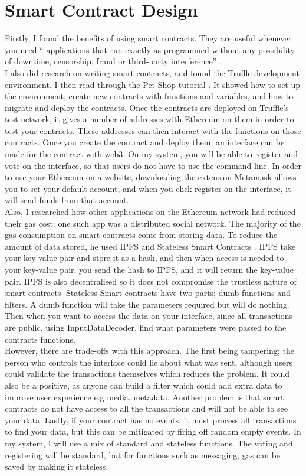 \section{Smart Contract Design} 
Firstly, I found the benefits of using smart contracts. They are useful whenever you need “ applications that run exactly as programmed without any possibility of downtime, censorship, fraud or third-party interference”  \citep{ethereum:2018:pdflatex}. \\
I also did research on writing smart contracts, and found the Truffle development environment. I then read through the Pet Shop tutorial \citep{Truffle:2017:pdflatex} . It showed how to set up the environment, create new contracts with functions and variables, and how to migrate and deploy the contracts. Once the contracts are deployed on Truffle's test network, it gives a number of addresses with Ethereum on them in order to test your contracts. These addresses can then interact with the functions on those contracts. Once you create the contract and deploy them, an interface can be made for the contract with web3. On my system, you will be able to register and vote on the interface, so that users do not have to use the command line. In order to use your Ethereum on a website, downloading the extension Metamask allows you to set your default account, and when you click register on the interface, it will send funds from that account. \\
Also, I researched how other applications on the Ethereum network had reduced their gas cost: one such app was a distributed social network. The majority of the gas consumption on smart contracts come from storing data. To reduce the amount of data stored, he used IPFS and Stateless Smart Contracts \citep{Childs-Maidment:2016:pdflatex}. IPFS take your key-value pair and store it as a hash, and then when access is needed to your key-value pair, you send the hash to IPFS, and it will return the key-value pair. IPFS is also decentralised so it does not compromise the trustless nature of smart contracts. Stateless Smart contracts have two parts; dumb functions and filters. A dumb function will take the parameters required but will do nothing. Then when you want to access the data on your interface, since all transactions are public, using InputDataDecoder, find what parameters were passed to the contracts functions.  \\
However, there are trade-offs with this approach. The first being tampering; the person who controls the interface could lie about what was sent,  although users could validate the transactions themselves which reduces the problem. It could also be a positive, as anyone can build a filter which could add extra data to improve user experience e.g media, metadata. Another problem is that smart contracts do not have access to all the transactions and will not be able to see your data. Lastly, if your contract has no events, it must process all transactions to find your data, but this can be mitigated by firing off random empty events. In my system, I will use a mix of standard and stateless functions. The voting and registering will be standard, but for functions such as messaging, gas can be saved by making it stateless. \\
